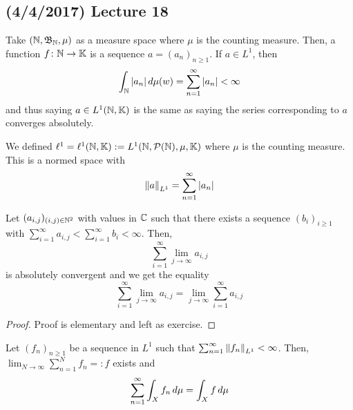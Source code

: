 \documentclass[11pt,leqno,oneside]{amsbook}
\numberwithin{thm}{section}
\renewcommand{\P}{\mathcal{P}} %
\newcommand{\K}{\mathbb{K}} %
\begin{document}
\subsection*{(4/4/2017) Lecture 18}
\begin{example}
  Take \((\N,\B_\N,\mu)\) as a measure space where \(\mu\) is the
  counting measure. Then, a function \(f \from \N \to \K\) is a
  sequence \(a = (a_n)_{n \geq 1}\). If \(a \in L^1\), then \[
    \int_\N |a_n| \d\mu(w) = \sum_{n=1}^\infty |a_n| < \infty
  \]
  and thus saying \(a \in L^1(\N,\K)\) is the same as saying the
  series corresponding to \(a\) converges absolutely.
\end{example}
\begin{defn}
  We defined \(\ell^1 = \ell^1(\N,\K) := L^1(\N,\P(\N),\mu,\K)\) where
  \(\mu\) is the counting measure. This is a normed space with \[
    \norm[a]_{L^1} = \sum_{n=1}^\infty |a_n|
  \]
\end{defn}
\begin{cor}
  Let \((a_{i,j})_{(i,j) \in \N^2}\) with values in \(\C\) such that
  there exists a sequence
  \((b_i)_{i \geq 1}\) with \(\sum_{i=1}^\infty a_{i,j} <
  \sum_{i=1}^\infty b_i < \infty\).
  Then, \[
    \sum_{i=1}^\infty \lim_{j \to \infty} a_{i,j}
  \]
  is absolutely convergent and we get the equality \[
    \sum_{i=1}^\infty \lim_{j \to \infty} a_{i,j} = \lim_{j \to
      \infty} \sum_{i=1}^\infty a_{i,j}
  \]
\end{cor}
\begin{proof}
  Proof is elementary and left as exercise.
\end{proof}
\begin{thm}
  Let \((f_n)_{n \geq 1}\) be a sequence in \(L^1\) such that
  \(\sum_{n=1}^\infty \norm[f_n]_{L^1} < \infty\). Then, \(\lim_{N \to
  \infty} \sum_{n=1}^N f_n =: f\) exists
  and \[
    \sum_{n=1}^\infty \int_X f_n \d\mu = \int_X f \d\mu
  \]
\end{thm}
\end{document}
